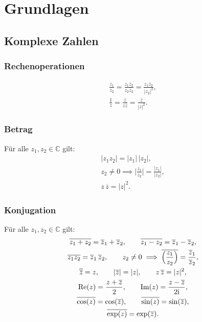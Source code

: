 
\chapter{Grundlagen}
\section{Komplexe Zahlen}
\subsection{Rechenoperationen}

\begin{gather}
\frac{z_1}{z_2}
= \frac{z_1\overline z_2}{z_2\overline z_2}
= \frac{z_1\overline z_2}{|z_2|^2},\\
\frac{1}{z} = \frac{\overline z}{z\overline z}
= \frac{\overline z}{|z|^2}.
\end{gather}

\subsection{Betrag}
Für alle $z_1,z_2\in\mathbb C$ gilt:
\begin{gather}
|z_1z_2| = |z_1|\,|z_2|,\\
z_2\ne 0\implies \Big|\frac{z_1}{z_2}\Big|
= \frac{|z_1|}{|z_2|},\\
z\,\overline z = |z|^2.
\end{gather}

\subsection{Konjugation}
Für alle $z_1,z_2\in\mathbb C$ gilt:
\begin{gather}
\overline{z_1+z_2} = \overline z_1+\overline z_2,\qquad
\overline{z_1-z_2} = \overline z_1-\overline z_2,\\
\overline{z_1 z_2} = \overline z_1\,\overline z_2,\qquad
z_2\ne 0 \implies \overline{\Big(\frac{z_1}{z_2}\Big)}
= \frac{\overline z_1}{\overline z_2},\\
\overline{\overline z}=z,\qquad
|\overline{z}| = |z|,\qquad
z\,\overline z = |z|^2,\\
\operatorname{Re}(z) = \frac{z+\overline z}{2},\qquad
\operatorname{Im}(z) = \frac{z-\overline z}{2\mathrm i},\\
\overline{\cos(z)} = \cos(\overline z),\qquad
\overline{\sin(z)} = \sin(\overline z),\\
\overline{\exp(z)} = \exp(\overline z).
\end{gather}

